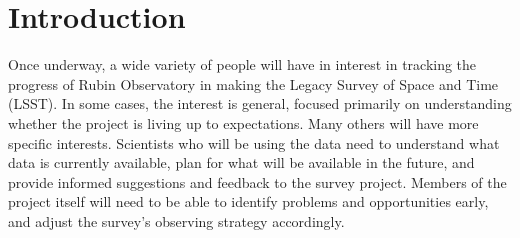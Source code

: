 
\section{Introduction}
\label{sec:orgeeb929d}

Once underway, a wide variety of people will have in interest in tracking the progress of Rubin Observatory in making the Legacy Survey of Space and Time (LSST).
In some cases, the interest is general, focused primarily on understanding whether the project is living up to expectations.
Many others will have more specific interests.
Scientists who will be using the data need to understand what data is currently available, plan for what will be available in the future, and provide informed suggestions and feedback to the survey project. 
Members of the project itself will need to be able to identify problems and opportunities early, and adjust the survey's observing strategy accordingly.

